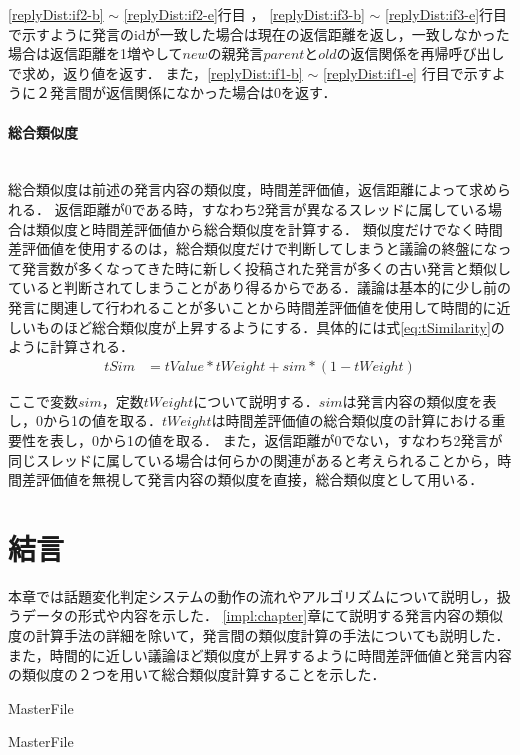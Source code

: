 \ref{replyDist:if2-b} $\sim$ \ref{replyDist:if2-e}行目 ， \ref{replyDist:if3-b} $\sim$ \ref{replyDist:if3-e}行目で示すように発言のidが一致した場合は現在の返信距離を返し，一致しなかった場合は返信距離を1増やして$new$の親発言$parent$と$old$の返信関係を再帰呼び出しで求め，返り値を返す．
また，\ref{replyDist:if1-b} $\sim$ \ref{replyDist:if1-e} 行目で示すように２発言間が返信関係になかった場合は0を返す．

\paragraph{総合類似度}\ \\
総合類似度は前述の発言内容の類似度，時間差評価値，返信距離によって求められる．
返信距離が0である時，すなわち2発言が異なるスレッドに属している場合は類似度と時間差評価値から総合類似度を計算する．
類似度だけでなく時間差評価値を使用するのは，総合類似度だけで判断してしまうと議論の終盤になって発言数が多くなってきた時に新しく投稿された発言が多くの古い発言と類似していると判断されてしまうことがあり得るからである．議論は基本的に少し前の発言に関連して行われることが多いことから時間差評価値を使用して時間的に近しいものほど総合類似度が上昇するようにする．具体的には式\ref{eq:tSimilarity}のように計算される．
\begin{equation}
\begin{aligned}
\label{eq:tSimilarity}
tSim & = tValue*tWeight + sim*(1-tWeight)
\end{aligned}
\end{equation}

ここで変数$sim$，定数$tWeight$について説明する．$sim$は発言内容の類似度を表し，0から1の値を取る．$tWeight$は時間差評価値の総合類似度の計算における重要性を表し，0から1の値を取る．
また，返信距離が0でない，すなわち2発言が同じスレッドに属している場合は何らかの関連があると考えられることから，時間差評価値を無視して発言内容の類似度を直接，総合類似度として用いる．

\section{結言}
\label{model:conclusion}
本章では話題変化判定システムの動作の流れやアルゴリズムについて説明し，扱うデータの形式や内容を示した．
\ref{impl:chapter}章にて説明する発言内容の類似度の計算手法の詳細を除いて，発言間の類似度計算の手法についても説明した．また，時間的に近しい議論ほど類似度が上昇するように時間差評価値と発言内容の類似度の２つを用いて総合類似度計算することを示した．


 \expandafter\ifx\csname MasterFile\endcsname\relax
	\def\BibFile{hoge}
	
  \fi
  \expandafter\ifx\csname MasterFile\endcsname\relax
  
  \fi
